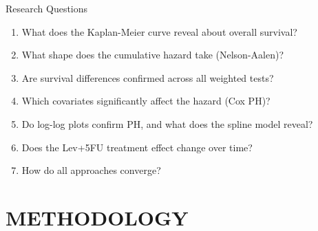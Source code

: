 \documentclass[aspectratio=169, 10pt]{beamer}
\begin{document}
	
\begin{frame}{Research Questions}	
	\begin{enumerate}
		\large
		\item What does the Kaplan-Meier
					curve reveal about overall survival?\\
					
		\item What shape does the cumulative
					hazard take (Nelson-Aalen)?\\
					
					\item Are survival differences
					confirmed across all weighted tests?
					
					\item Which covariates significantly
					affect the hazard (Cox PH)?
					
					\item Do log-log plots confirm PH,
					and what does the spline model reveal?
					
					\item \alert{Does the Lev+5FU
						treatment effect change over time?}
						
					\item How do all approaches
					converge?
				\end{enumerate}	
\end{frame}




\section{METHODOLOGY}


\begin{frame}
	\begin{center}
		\colorbox{white}{}
	\end{center}
\end{frame}
\end{document}
